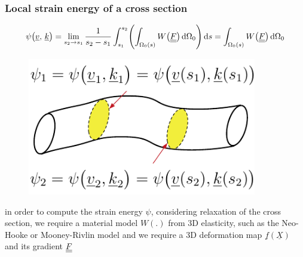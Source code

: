 \begin{frame}
  \frametitle{Local strain energy of a cross section}
  \vspace{-0.5em}  
  \begin{displaymath}
    \psi \bigl( \underline{v} , \, \underline{k} \bigr) =
    \lim_{s_2 \to s_1} \frac{1}{s_2 - s_1} \int_{s_1}^{s_2}  \Biggl( \int_{\Omega_0(s)} W \bigl( \doubleunderline{F} \bigr) \dif \Omega_0 \Biggr) \dif s =
    \int_{\Omega_0(s)} W \bigl( \doubleunderline{F} \bigr) \dif \Omega_0
  \end{displaymath}

  \begin{figure}
    \centering
    \includegraphics[width=10cm, keepaspectratio=true]{sections/cosserat_rods/images/LocalEnergy}
  \end{figure}
  
  \vspace{0.5em}
  in order to compute the strain energy $\psi$, considering relaxation of the cross section,
  we require a material model $W(.)$ from 3D elasticity, such as the Neo-Hooke or Mooney-Rivlin model and we require a 3D deformation map $\underline{f}(\underline{X})$ and its gradient $\underline{\underline{F}}$  
\end{frame}



